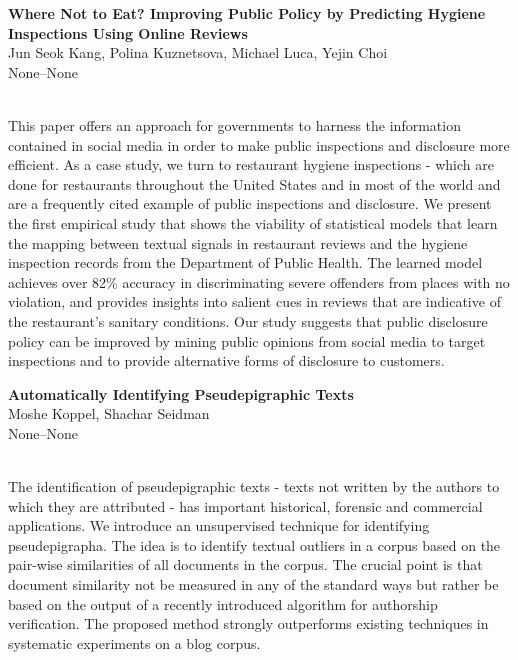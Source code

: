\documentclass[twoside,makeidx]{book}
\begin{document}
\par\vspace{2em}\noindent%
\begin{minipage}{\linewidth}%
\begin{center}
\textbf{\normalsize Where Not to Eat? Improving Public Policy by Predicting Hygiene Inspections Using Online Reviews}\\
\normalsize  Jun Seok Kang,  Polina Kuznetsova,  Michael Luca,  Yejin Choi\\
{\small None--None}\\
\end{center}
\end{minipage}\\[0.5em]
\nopagebreak%
\noindent%
{\small This paper offers an approach for governments to harness the information contained in social media in order to make public inspections and disclosure more efficient. As a case study, we turn to restaurant hygiene inspections - which are done for restaurants throughout the United States and in most of the world and are a frequently cited example of public inspections and disclosure. We present the first empirical study that shows the viability of statistical models that learn the mapping between textual signals in restaurant reviews and the hygiene inspection records from the Department of Public Health. The learned model achieves over 82\% accuracy in discriminating severe offenders from places with no violation, and provides insights into salient cues in reviews that are indicative of the restaurant's sanitary conditions. Our study suggests that public disclosure policy can be improved by mining public opinions from social media to target inspections and to provide alternative forms of disclosure to customers.}
\par\vspace{2em}\noindent%
\begin{minipage}{\linewidth}%
\begin{center}
\textbf{\normalsize Automatically Identifying Pseudepigraphic Texts}\\
\normalsize  Moshe Koppel,  Shachar Seidman\\
{\small None--None}\\
\end{center}
\end{minipage}\\[0.5em]
\nopagebreak%
\noindent%
{\small The identification of pseudepigraphic texts - texts not written by the authors to which they are attributed - has important historical, forensic and commercial applications. We introduce an unsupervised technique for identifying pseudepigrapha. The idea is to identify textual outliers in a corpus based on the pair-wise similarities of all documents in the corpus. The crucial point is that document similarity not be measured in any of the standard ways but rather be based on the output of a recently introduced algorithm for authorship verification. The proposed method strongly outperforms existing techniques in systematic experiments on a blog corpus.}
\clearpage
\end{document}

